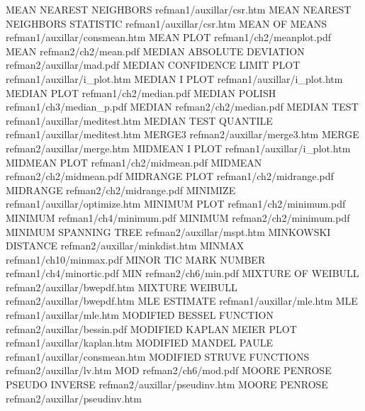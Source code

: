 MEAN NEAREST NEIGHBORS                  refman1/auxillar/csr.htm
MEAN NEAREST NEIGHBORS STATISTIC        refman1/auxillar/csr.htm
MEAN OF MEANS                           refman1/auxillar/consmean.htm
MEAN PLOT                               refman1/ch2/meanplot.pdf
MEAN                                    refman2/ch2/mean.pdf
MEDIAN ABSOLUTE DEVIATION               refman2/auxillar/mad.pdf
MEDIAN CONFIDENCE LIMIT PLOT            refman1/auxillar/i_plot.htm
MEDIAN I PLOT                           refman1/auxillar/i_plot.htm
MEDIAN PLOT                             refman1/ch2/median.pdf
MEDIAN POLISH                           refman1/ch3/median_p.pdf
MEDIAN                                  refman2/ch2/median.pdf
MEDIAN TEST                             refman1/auxillar/meditest.htm
MEDIAN TEST QUANTILE                    refman1/auxillar/meditest.htm
MERGE3                                  refman2/auxillar/merge3.htm
MERGE                                   refman2/auxillar/merge.htm
MIDMEAN I PLOT                          refman1/auxillar/i_plot.htm
MIDMEAN PLOT                            refman1/ch2/midmean.pdf
MIDMEAN                                 refman2/ch2/midmean.pdf
MIDRANGE PLOT                           refman1/ch2/midrange.pdf
MIDRANGE                                refman2/ch2/midrange.pdf
MINIMIZE                                refman1/auxillar/optimize.htm
MINIMUM PLOT                            refman1/ch2/minimum.pdf
MINIMUM                                 refman1/ch4/minimum.pdf
MINIMUM                                 refman2/ch2/minimum.pdf
MINIMUM SPANNING TREE                   refman2/auxillar/mspt.htm
MINKOWSKI DISTANCE                      refman2/auxillar/minkdist.htm
MINMAX                                  refman1/ch10/minmax.pdf
MINOR TIC MARK NUMBER                   refman1/ch4/minortic.pdf
MIN                                     refman2/ch6/min.pdf
MIXTURE OF WEIBULL                      refman2/auxillar/bwepdf.htm
MIXTURE WEIBULL                         refman2/auxillar/bwepdf.htm
MLE ESTIMATE                            refman1/auxillar/mle.htm
MLE                                     refman1/auxillar/mle.htm
MODIFIED BESSEL FUNCTION                refman2/auxillar/bessin.pdf
MODIFIED KAPLAN MEIER PLOT              refman1/auxillar/kaplan.htm
MODIFIED MANDEL PAULE                   refman1/auxillar/consmean.htm
MODIFIED STRUVE FUNCTIONS               refman2/auxillar/lv.htm
MOD                                     refman2/ch6/mod.pdf
MOORE PENROSE PSEUDO INVERSE            refman2/auxillar/pseudinv.htm
MOORE PENROSE                           refman2/auxillar/pseudinv.htm
